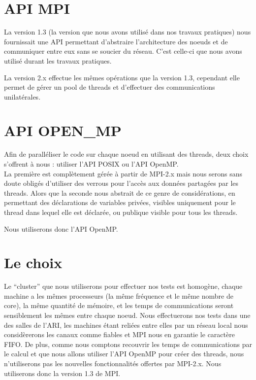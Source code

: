 \section{API MPI}
\par La version 1.3 (la version que nous avons utilisé dans nos travaux pratiques)
nous fournissait une API permettant d'abstraire 
l'architecture des noeuds et de communiquer entre eux sans se soucier du réseau. C'est
celle-ci que nous avons utilisé durant les travaux pratiques.\\

\par La version 2.x effectue les mêmes opérations que la version 1.3,
cependant elle permet de gérer un pool de threads et d'effectuer des communications unilatérales.\\

\section{API OPEN\_MP}
\par Afin de paralléliser le code sur chaque noeud en utilisant des threads,
deux choix s'offrent à nous : utiliser l'API POSIX ou l'API OpenMP.\\
La première est complètement gérée à partir de MPI-2.x mais nous serons sans doute
obligés d'utiliser des verrous pour l'accès aux données partagées par les threads.
Alors que la seconde nous abstrait de ce genre de considérations, en permettant 
des déclarations de variables privées, visibles uniquement pour le thread dans lequel elle est déclarée, 
ou publique visible pour tous les threads.\\

\par Nous utiliserons donc l'API OpenMP.\\

\section{Le choix}
\par Le ``cluster'' que nous utiliserons pour effectuer nos tests 
est homogène, chaque machine a les mêmes processeurs (la même fréquence et le même nombre de core),
la même quantité de mémoire, et les temps de communications seront sensiblement 
les mêmes entre chaque noeud. Nous effectuerons nos tests dans une des salles 
de l'ARI, les machines étant reliées entre elles par un réseau local nous considèrerons 
les canaux comme fiables et MPI nous en garantie le caractère FIFO.
De plus, comme nous comptons recouvrir les temps
de communications par le calcul et que nous allons utiliser l'API OpenMP 
pour créer des threads, nous n'utiliserons pas les nouvelles fonctionnalités offertes
par MPI-2.x. Nous utiliserons donc la version 1.3 de MPI.\\

